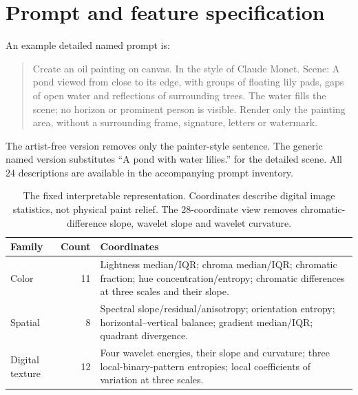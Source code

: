 \documentclass[11pt]{article}
\begin{document}
\appendix
\section{Prompt and feature specification}
\label{app:prompt}
An example detailed named prompt is:
\begin{quote}\small
Create an oil painting on canvas. In the style of Claude Monet. Scene: A pond
viewed from close to its edge, with groups of floating lily pads, gaps of open
water and reflections of surrounding trees. The water fills the scene; no horizon
or prominent person is visible. Render only the painting area, without a
surrounding frame, signature, letters or watermark.
\end{quote}
The artist-free version removes only the painter-style sentence. The generic
named version substitutes ``A pond with water lilies.'' for the detailed scene.
All 24 descriptions are available in the accompanying prompt inventory.

\label{app:features}
\begin{table}[htbp]
\centering\small
\begin{tabularx}{\linewidth}{l r X}
\toprule
Family & Count & Coordinates\\
\midrule
Color & 11 & Lightness median/IQR; chroma median/IQR; chromatic fraction;
hue concentration/entropy; chromatic differences at three scales and their slope.\\
Spatial & 8 & Spectral slope/residual/anisotropy; orientation entropy;
horizontal--vertical balance; gradient median/IQR; quadrant divergence.\\
Digital texture & 12 & Four wavelet energies, their slope and curvature;
three local-binary-pattern entropies; local coefficients of variation at three scales.\\
\bottomrule
\end{tabularx}
\caption{The fixed interpretable representation. Coordinates describe digital
image statistics, not physical paint relief. The 28-coordinate view removes
chromatic-difference slope, wavelet slope and wavelet curvature.}
\end{table}
\end{document}
